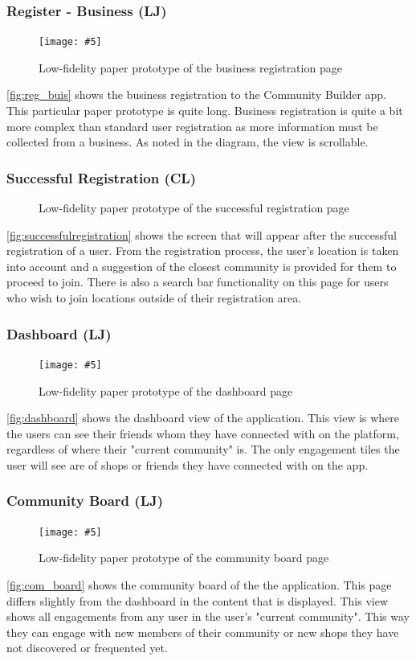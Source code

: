 \documentclass[a4paper,12pt]{article}
\newcommand{\includescalefigure}[5]{
\begin{figure}[H]
\centering
\texttt{[image: \#5]}
\captionsetup{width=.8\linewidth} 
\caption[#2]{#3}
\label{#1}
\end{figure}
}
\newcommand{\ciaraincludescalefigure}[5]{
\begin{figure}[H]
\centering
\rotatebox[origin=c]{270}{\texttt{[image: \#5]}}
\captionsetup{width=.8\linewidth} 
\caption[#2]{#3}
\label{#1}
\end{figure}
}
\begin{document}
\subsubsection{Register - Business (LJ)}
\includescalefigure{fig:reg_buis}{Business Registration Paper Prototype}{Low-fidelity paper prototype of the business registration page}{0.5}{prototypes/register_business.PNG}
\autoref{fig:reg_buis} shows the business registration to the Community Builder app.
This particular paper prototype is quite long. Business registration is quite a bit more complex than standard user registration as more information must be collected from a business. As noted in the diagram, the view is scrollable.
\subsubsection{Successful Registration (CL)} 
\ciaraincludescalefigure{fig:successfulregistration}{Successful Registration Page Paper Prototype}{Low-fidelity paper prototype of the successful registration page}{0.9}{prototypes/successfulregistration.png}
\autoref{fig:successfulregistration} shows the screen that will appear after the successful registration of a user. From the registration process, the user's location is taken into account and a suggestion of the closest community is provided for them to proceed to join. There is also a search bar functionality on this page for users who wish to join locations outside of their registration area.
\subsubsection{Dashboard (LJ)}
\includescalefigure{fig:dashboard}{Dashboard Paper Prototype}{Low-fidelity paper prototype of the dashboard page}{1}{prototypes/dashboard.PNG}
\autoref{fig:dashboard} shows the dashboard view of the application. This view is where the users can see their friends whom they have connected with on the platform, regardless of where their "current community" is. The only engagement tiles the user will see are of shops or friends they have connected with on the app.
\subsubsection{Community Board (LJ)}
\includescalefigure{fig:com_board}{Community Board Paper Prototype}{Low-fidelity paper prototype of the community board page}{1}{prototypes/community_board.PNG}
\autoref{fig:com_board} shows the community board of the the application. This page differs slightly from the dashboard in the content that is displayed. This view shows all engagements from any user in the user's "current community". This way they can engage with new members of their community or new shops they have not discovered or frequented yet.
\end{document}

